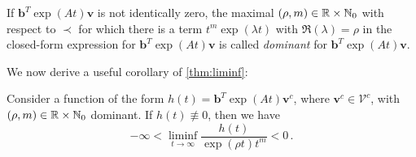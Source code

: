 \begin{definition}
If $\boldsymbol{b}^{T}\exp(At)\boldsymbol{v}$ is not identically zero,
the maximal $(\rho,m)\in\mathbb{R}\times\mathbb{N}_{0}$ with respect
to $\prec$ for which there is a term $t^{m}\exp (\lambda t)$ with
$\Re(\lambda)=\rho$ in the closed-form expression for
$\boldsymbol{b}^{T}\exp(At)\boldsymbol{v}$ is called \emph{dominant} for
$\boldsymbol{b}^{T}\exp(At)\boldsymbol{v}$.
\end{definition}

We now derive a useful corollary of \cref{thm:liminf}:

\begin{corollary}
\label{cor:liminf}
Consider a function of the form $h(t)=\boldsymbol{b}^{T}\exp(At) \boldsymbol{v}^{c}$, where $\boldsymbol{v}^{c}\in\mathcal{V}^{c}$, with $(\rho,m)\in\mathbb{R}\times \mathbb{N}_{0}$ dominant. If $h(t)\not\equiv 0$, then we have
\begin{equation*}
-\infty<\liminf\limits_{t\rightarrow\infty} \frac{h(t)}{\exp(\rho
  t)t^{m}}<0 \, .
\end{equation*}
\end{corollary}


